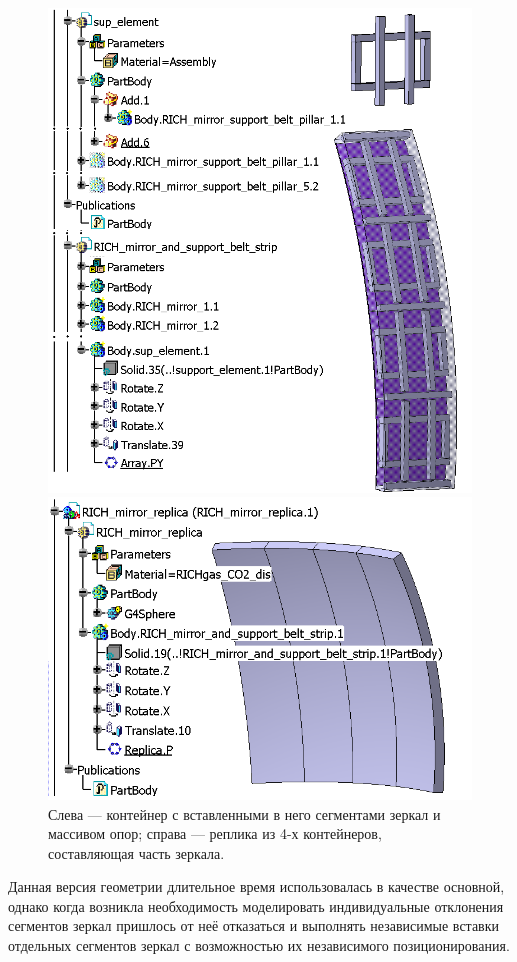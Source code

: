 \begin{figure}[H]
\begin{minipage}[t]{0.49\textwidth}
\includegraphics[width=1.0\textwidth]{pictures/CbmRichMirror1.png}
\end{minipage}
\hspace{0.01\textwidth}
\begin{minipage}[t]{0.49\textwidth}
\includegraphics[width=1.0\textwidth]{pictures/CbmRichMirror2.png}
\end{minipage}
\caption{Слева --- контейнер с вставленными в него сегментами зеркал и массивом опор; справа --- реплика из 4-х контейнеров, составляющая часть зеркала.}
\label{fig:ReplicaMirror}
\end{figure}

Данная версия геометрии длительное время использовалась в качестве основной, однако когда возникла необходимость моделировать индивидуальные отклонения сегментов зеркал пришлось от неё отказаться и выполнять независимые вставки отдельных сегментов зеркал с возможностью их независимого позиционирования. %
